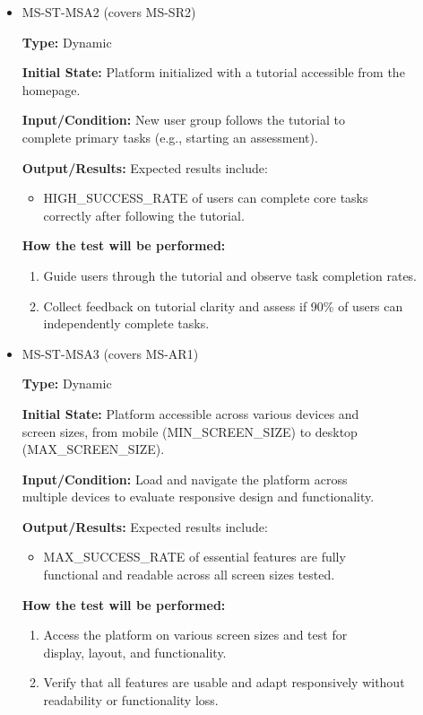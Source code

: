 \documentclass[12pt, titlepage]{article}
\begin{document}
\begin{itemize}
  \item MS-ST-MSA2 (covers MS-SR2) 
  \begin{mdframed}[linewidth=0.5mm] 
    \textbf{Type:} Dynamic \par 
    \textbf{Initial State:} Platform initialized with a tutorial accessible from the homepage. \par 
    \textbf{Input/Condition:} New user group follows the tutorial to \\complete primary tasks (e.g., starting an assessment). \par 
    \textbf{Output/Results:} Expected results include: 
    \begin{itemize} 
      \item HIGH\_SUCCESS\_RATE of users can complete core tasks \\correctly after following the tutorial. 
    \end{itemize} \par \textbf{How the test will be performed:} 
    \begin{enumerate}[noitemsep] 
      \item Guide users through the tutorial and observe task completion rates. 
      \item Collect feedback on tutorial clarity and assess if 90\% of users can independently complete tasks. 
    \end{enumerate} 
  \end{mdframed}

  \item MS-ST-MSA3 (covers MS-AR1)
  \begin{mdframed}[linewidth=0.5mm] 
    \textbf{Type:} Dynamic \par 
    \textbf{Initial State:} Platform accessible across various devices and \\screen sizes, from mobile (MIN\_SCREEN\_SIZE) to desktop \\(MAX\_SCREEN\_SIZE). \par 
    \textbf{Input/Condition:} Load and navigate the platform across \\multiple devices to evaluate responsive design and functionality. \par 
    \textbf{Output/Results:} Expected results include: 
    \begin{itemize} 
      \item MAX\_SUCCESS\_RATE of essential features are fully \\functional and readable across all screen sizes tested. 
    \end{itemize} \par 
    \textbf{How the test will be performed:} 
    \begin{enumerate}[noitemsep] 
      \item Access the platform on various screen sizes and test for \\display, layout, and functionality. 
      \item Verify that all features are usable and adapt responsively without readability or functionality loss. 
    \end{enumerate} 
  \end{mdframed} 
\end{itemize}
\end{document}
